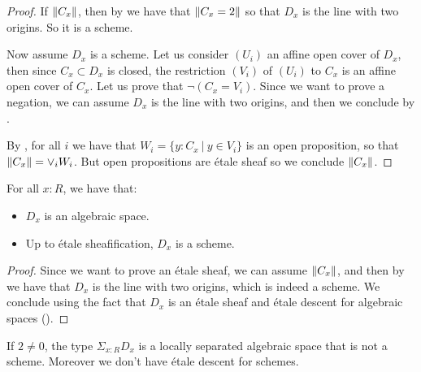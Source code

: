 \begin{proof}
If $\lVert C_x \rVert$, then by  we have that $\lVert C_x=2 \rVert$ so that $D_x$ is the line with two origins. So it is a scheme.

Now assume $D_x$ is a scheme. Let us consider $(U_i)$ an affine open cover of $D_x$, then since $C_x\subset D_x$ is closed, the restriction $(V_i)$ of $(U_i)$ to $C_x$ is an affine open cover of $C_x$. Let us prove that $\neg (C_x=V_i)$. Since we want to prove a negation, we can assume $D_x$ is the line with two origins, and then we conclude by .

By , for all $i$ we have that $W_i = \{y:C_x\ |\ y\in V_i\}$ is an open proposition, so that $\lVert C_x \rVert = \lor_iW_i$. But open propositions are étale sheaf so we conclude $\lVert C_x \rVert$.
\end{proof}

\begin{corollary}\label{no-descent-for-old-scheme}
For all $x:R$, we have that:
\begin{itemize}
\item $D_x$ is an algebraic space.
\item Up to étale sheafification, $D_x$ is a scheme.
\end{itemize}
\end{corollary}

\begin{proof}
Since we want to prove an étale sheaf, we can assume $\lVert C_x \rVert$, and then by  we have that $D_x$ is the line with two origins, which is indeed a scheme. We conclude using the fact that $D_x$ is an étale sheaf and étale descent for algebraic spaces ().
\end{proof}

\begin{proposition}
If $2\not=0$, the type $\Sigma_{x:R}D_x$ is a locally separated algebraic space that is not a scheme. Moreover we don't have étale descent for schemes.
\end{proposition}

